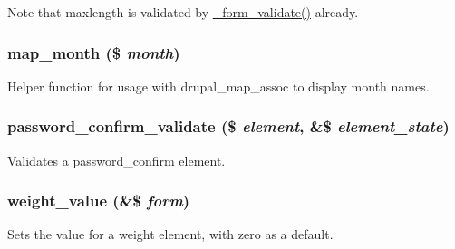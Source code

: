 Note that maxlength is validated by \hyperlink{group__form__api_ga464b4724506722d2a2d482df27736357}{\_\-form\_\-validate()} already. \hypertarget{group__form__api_ga11e3cb67c8622b662acc4dff61e146a7}{
\subsubsection[{map\_\-month}]{\setlength{\rightskip}{0pt plus 5cm}map\_\-month (\$ {\em month})}}
\label{group__form__api_ga11e3cb67c8622b662acc4dff61e146a7}
Helper function for usage with drupal\_\-map\_\-assoc to display month names. \hypertarget{group__form__api_gafa275652bc0a5641a124bc60727caa8a}{
\subsubsection[{password\_\-confirm\_\-validate}]{\setlength{\rightskip}{0pt plus 5cm}password\_\-confirm\_\-validate (\$ {\em element}, \/  \&\$ {\em element\_\-state})}}
\label{group__form__api_gafa275652bc0a5641a124bc60727caa8a}
Validates a password\_\-confirm element. \hypertarget{group__form__api_gad80eba4897b841808cb71e6ba97603b2}{
\subsubsection[{weight\_\-value}]{\setlength{\rightskip}{0pt plus 5cm}weight\_\-value (\&\$ {\em form})}}
\label{group__form__api_gad80eba4897b841808cb71e6ba97603b2}
Sets the value for a weight element, with zero as a default. 